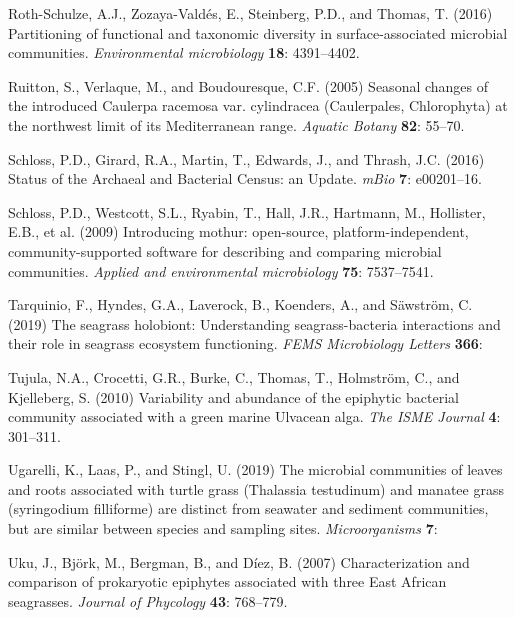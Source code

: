 \documentclass[12pt,]{article}
\begin{document}
\leavevmode\hypertarget{ref-Roth-Schulze2016}{}%
Roth-Schulze, A.J., Zozaya-Valdés, E., Steinberg, P.D., and Thomas, T.
(2016) Partitioning of functional and taxonomic diversity in
surface-associated microbial communities. \emph{Environmental
microbiology} \textbf{18}: 4391--4402.

\leavevmode\hypertarget{ref-Ruitton2005}{}%
Ruitton, S., Verlaque, M., and Boudouresque, C.F. (2005) Seasonal
changes of the introduced Caulerpa racemosa var. cylindracea
(Caulerpales, Chlorophyta) at the northwest limit of its Mediterranean
range. \emph{Aquatic Botany} \textbf{82}: 55--70.

\leavevmode\hypertarget{ref-Schloss2016}{}%
Schloss, P.D., Girard, R.A., Martin, T., Edwards, J., and Thrash, J.C.
(2016) Status of the Archaeal and Bacterial Census: an Update.
\emph{mBio} \textbf{7}: e00201--16.

\leavevmode\hypertarget{ref-Schloss2009}{}%
Schloss, P.D., Westcott, S.L., Ryabin, T., Hall, J.R., Hartmann, M.,
Hollister, E.B., et al. (2009) Introducing mothur: open-source,
platform-independent, community-supported software for describing and
comparing microbial communities. \emph{Applied and environmental
microbiology} \textbf{75}: 7537--7541.

\leavevmode\hypertarget{ref-Tarquinio2019}{}%
Tarquinio, F., Hyndes, G.A., Laverock, B., Koenders, A., and Säwström,
C. (2019) The seagrass holobiont: Understanding seagrass-bacteria
interactions and their role in seagrass ecosystem functioning.
\emph{FEMS Microbiology Letters} \textbf{366}:

\leavevmode\hypertarget{ref-Tujula2010}{}%
Tujula, N.A., Crocetti, G.R., Burke, C., Thomas, T., Holmström, C., and
Kjelleberg, S. (2010) Variability and abundance of the epiphytic
bacterial community associated with a green marine Ulvacean alga.
\emph{The ISME Journal} \textbf{4}: 301--311.

\leavevmode\hypertarget{ref-Ugarelli2019}{}%
Ugarelli, K., Laas, P., and Stingl, U. (2019) The microbial communities
of leaves and roots associated with turtle grass (Thalassia testudinum)
and manatee grass (syringodium filliforme) are distinct from seawater
and sediment communities, but are similar between species and sampling
sites. \emph{Microorganisms} \textbf{7}:

\leavevmode\hypertarget{ref-Uku2007}{}%
Uku, J., Björk, M., Bergman, B., and Díez, B. (2007) Characterization
and comparison of prokaryotic epiphytes associated with three East
African seagrasses. \emph{Journal of Phycology} \textbf{43}: 768--779.
\end{document}
